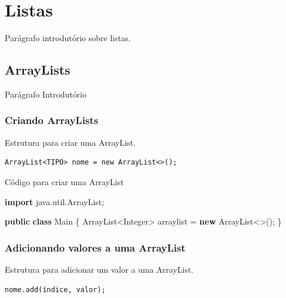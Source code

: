 \documentclass[
]{book}
\newenvironment{Shaded}{\begin{snugshade}}{\end{snugshade}}
\newcommand{\BuiltInTok}[1]{#1}
\newcommand{\ImportTok}[1]{#1}
\newcommand{\KeywordTok}[1]{\textcolor[rgb]{0.13,0.29,0.53}{\textbf{#1}}}
\newcommand{\NormalTok}[1]{#1}
\begin{document}
\hypertarget{listas}{%
\section{Listas}\label{listas}}

Parágrafo introdutório sobre listas.

\hypertarget{arraylists}{%
\subsection{ArrayLists}\label{arraylists}}

Parágrafo Introdutório

\hypertarget{criando-arraylists}{%
\subsubsection*{Criando ArrayLists}\label{criando-arraylists}}

Estrutura para criar uma ArrayList.

\begin{verbatim}
ArrayList<TIPO> nome = new ArrayList<>();
\end{verbatim}

Código para criar uma ArrayList

\begin{Shaded}
\begin{Highlighting}[]
\KeywordTok{import}\ImportTok{ java.util.ArrayList;}

\KeywordTok{public} \KeywordTok{class}\NormalTok{ Main \{}
    \BuiltInTok{ArrayList}\NormalTok{<}\BuiltInTok{Integer}\NormalTok{> arraylist = }\KeywordTok{new} \BuiltInTok{ArrayList}\NormalTok{<>();}
\NormalTok{\}}
\end{Highlighting}
\end{Shaded}

\hypertarget{adicionando-valores-a-uma-arraylist}{%
\subsubsection*{Adicionando valores a uma ArrayList}\label{adicionando-valores-a-uma-arraylist}}

Estrutura para adicionar um valor a uma ArrayList.

\begin{verbatim}
nome.add(índice, valor);
\end{verbatim}
\end{document}
